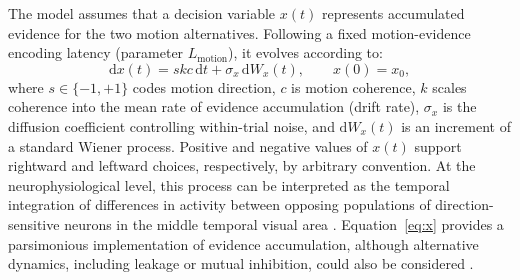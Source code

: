 \documentclass[a4paper,11pt]{article}
\theoremstyle{definition}
\newcommand{\dd}{\mathrm d}
\newcommand{\1}{\mathbbm{1}}
\begin{document}
The model assumes that a decision variable $x(t)$ represents accumulated evidence for the two motion alternatives. Following a fixed motion-evidence encoding latency (parameter $L_{\mathrm{motion}}$), it evolves according to:
\begin{equation}
\dd x(t)=skc\,\dd t+\sigma_{x}\,\dd W_{x}(t), \qquad x(0)=x_{0},
\label{eq:x}
\end{equation}
where $s\in\{-1,+1\}$ codes motion direction, $c$ is motion coherence, $k$ scales coherence into the mean rate of evidence accumulation (drift rate), $\sigma_{x}$ is the diffusion coefficient controlling within-trial noise, and $\dd W_{x}(t)$ is an increment of a standard Wiener process. Positive and negative values of $x(t)$ support rightward and leftward choices, respectively, by arbitrary convention. At the neurophysiological level, this process can be interpreted as the temporal integration of differences in activity between opposing populations of direction-sensitive neurons in the middle temporal visual area \parencites{goldNeuralBasisDecision2007}{mazurekRoleNeuralIntegrators2003}. Equation~\eqref{eq:x} provides a parsimonious implementation of evidence accumulation, although alternative dynamics, including leakage or mutual inhibition, could also be considered \parencites[e.g.,][]{servantNeurallyConstrainedModeling2019}{usherTimeCoursePerceptual2001}.
\end{document}
